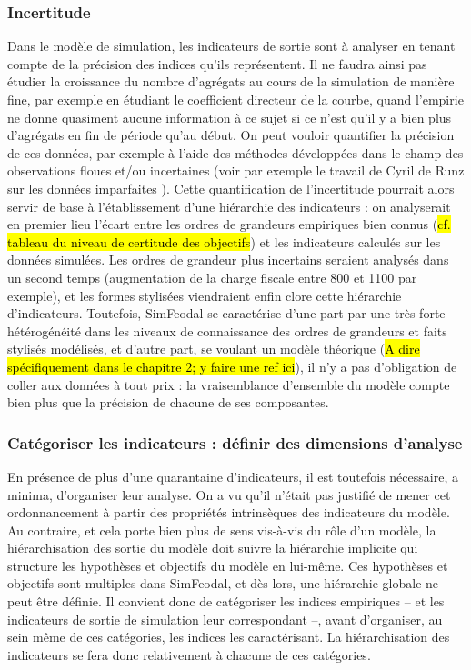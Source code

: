 \subsubsection{Incertitude}\label{sssec:incertitude}
Dans le modèle de simulation, les indicateurs de sortie sont à analyser en tenant compte de la précision des indices qu'ils représentent. Il ne faudra ainsi pas étudier la croissance  du nombre d'agrégats au cours de la simulation de manière fine, par exemple en étudiant le coefficient directeur de la courbe, quand l'empirie ne donne quasiment aucune information à ce sujet si ce n'est qu'il y a bien plus d'agrégats en fin de période qu'au début.
On peut vouloir quantifier la précision de ces données, par exemple à l'aide des méthodes développées dans le champ des observations floues et/ou incertaines (voir par exemple le travail de Cyril de Runz sur les données \og imparfaites\fg{} \autocite{de2008imperfection}).
Cette quantification de l'incertitude pourrait alors servir de base à l'établissement d'une hiérarchie des indicateurs : on analyserait en premier lieu l'écart entre les ordres de grandeurs empiriques bien connus (\hl{cf. tableau du niveau de certitude des objectifs}) et les indicateurs calculés sur les données simulées. Les ordres de grandeur plus incertains seraient analysés dans un second temps (augmentation de la charge fiscale entre 800 et 1100 par exemple), et les formes stylisées viendraient enfin clore cette hiérarchie d'indicateurs.
Toutefois, SimFeodal se caractérise d'une part par une très forte hétérogénéité dans les niveaux de connaissance des ordres de grandeurs et faits stylisés modélisés, et d'autre part, se voulant un modèle théorique (\hl{A dire spécifiquement dans le chapitre 2; y faire une ref ici}), il n'y a pas d'obligation de \og coller aux données\fg{} à tout prix : la vraisemblance d'ensemble du modèle compte bien plus que la précision de chacune de ses composantes.


\subsubsection{Catégoriser les indicateurs : définir des dimensions d'analyse}
En présence de plus d'une quarantaine d'indicateurs, il est toutefois nécessaire, a minima, d'organiser leur analyse. On a vu qu'il n'était pas justifié de mener cet ordonnancement à partir des propriétés intrinsèques des indicateurs du modèle.
Au contraire, et cela porte bien plus de sens vis-à-vis du rôle d'un modèle, la hiérarchisation des sortie du modèle doit suivre la hiérarchie implicite qui structure les hypothèses et objectifs du modèle en lui-même.
Ces hypothèses et objectifs sont multiples dans SimFeodal, et dès lors, une hiérarchie globale ne peut être définie. Il convient donc de catégoriser les indices empiriques -- et les indicateurs de sortie de simulation leur correspondant --, avant d'organiser, au sein même de ces catégories, les indices les caractérisant. La hiérarchisation des indicateurs se fera donc relativement à chacune de ces catégories.


